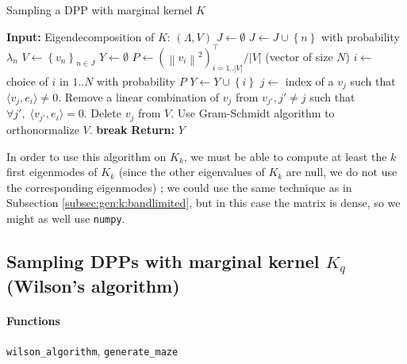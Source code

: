 \documentclass{article}
\newcommand{\abs} [1] {\left| #1 \right|}
\newcommand{\norm}[1]{\left\|#1\right\|}
\newcommand{\scal}[2]{\langle #1,#2 \rangle}
\begin{document}
\begin{algorithm}[ht]
\caption{Sampling a DPP with marginal kernel $K$}
\label{alg:sampling_dpp_from_kernel}
\begin{algorithmic} %
    \STATE \textbf{Input:} Eigendecomposition of $K$: $(\Lambda, V)$
    \STATE $J \leftarrow \emptyset$
			\STATE $J \leftarrow J \cup \left\{ n \right\}$ with probability $\lambda_n$
		\ENDFOR
		\STATE $V \leftarrow \left\{ v_n \right\}_{n \in J}$
		\STATE $Y \leftarrow \emptyset$
    \WHILE{$\abs{V} > 0$}
        \STATE $P \leftarrow (\norm{v_i}^2)_{i=1..\abs{V}}^\top / \abs{V}$ (vector of size $N$)
				\STATE $i \leftarrow$ choice of $i$ in $1..N$ with probability $P$
				\STATE $Y \leftarrow Y \cup \left\{i\right\}$
				\IF{$\abs{V} > 1$}
					\STATE $j \leftarrow$ index of a $v_j$ such that $\scal{v_j}{e_i} \neq 0$.
					\STATE Remove a linear combination of $v_j$ from $v_{j'}, j'\neq j$ such that $\forall j', \; \scal{v_{j'}}{e_i} = 0$.
					\STATE Delete $v_j$ from $V$.
					\STATE Use Gram-Schmidt algorithm to orthonormalize $V$.
				\ELSE
					\STATE \textbf{break}
				\ENDIF
    \ENDWHILE
		\STATE \textbf{Return:} $Y$
\end{algorithmic}
\end{algorithm}



In order to use this algorithm on $K_k$, we must be able to compute at least the $k$ first eigenmodes of $K_k$ (since the other eigenvalues of $K_k$ are null, we do not use the corresponding eigenmodes) ; we could use the same technique as in Subsection \ref{subsec:gen:k:bandlimited}, but in this case the matrix is dense, so we might as well use \verb#numpy#.%


\subsection[Sampling DPPs with marginal kernel Kq (Wilson's algorithm)]{Sampling DPPs with marginal kernel $K_q$ (Wilson's algorithm)} \label{subs:sampling:wilson}


\paragraph{Functions} \verb#wilson_algorithm#, \verb#generate_maze#
\end{document}
